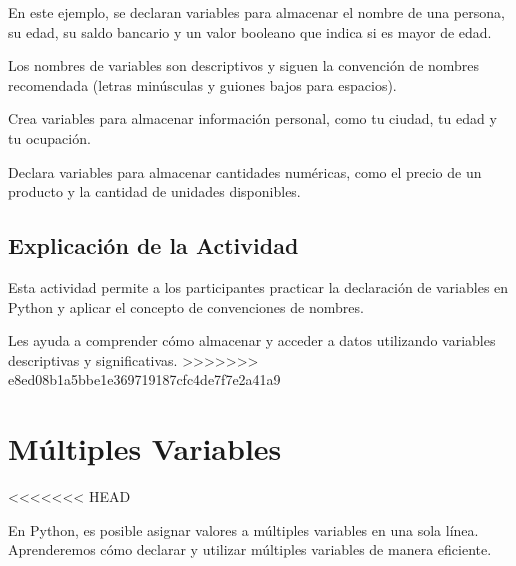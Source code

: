 \documentclass[
  a4paper,
  onepage,
  openany]{scrreprt}
\begin{document}
En este ejemplo, se declaran variables para almacenar el nombre de una
persona, su edad, su saldo bancario y un valor booleano que indica si es
mayor de edad.

Los nombres de variables son descriptivos y siguen la convención de
nombres recomendada (letras minúsculas y guiones bajos para espacios).

\begin{tcolorbox}[enhanced jigsaw, breakable, opacityback=0, toptitle=1mm, coltitle=black, toprule=.15mm, rightrule=.15mm, colframe=quarto-callout-important-color-frame, opacitybacktitle=0.6, arc=.35mm, title=\textcolor{quarto-callout-important-color}{\faExclamation}\hspace{0.5em}{Actividad Práctica}, titlerule=0mm, colbacktitle=quarto-callout-important-color!10!white, bottomtitle=1mm, bottomrule=.15mm, colback=white, left=2mm, leftrule=.75mm]

Crea variables para almacenar información personal, como tu ciudad, tu
edad y tu ocupación.

Declara variables para almacenar cantidades numéricas, como el precio de
un producto y la cantidad de unidades disponibles.

\end{tcolorbox}

\hypertarget{explicaciuxf3n-de-la-actividad-9}{%
\section{Explicación de la
Actividad}\label{explicaciuxf3n-de-la-actividad-9}}

Esta actividad permite a los participantes practicar la declaración de
variables en Python y aplicar el concepto de convenciones de nombres.

Les ayuda a comprender cómo almacenar y acceder a datos utilizando
variables descriptivas y significativas.
\textgreater\textgreater\textgreater\textgreater\textgreater\textgreater\textgreater{}
e8ed08b1a5bbe1e369719187cfc4de7f7e2a41a9

\hypertarget{muxfaltiples-variables}{%
\chapter{Múltiples Variables}\label{muxfaltiples-variables}}

\textless\textless\textless\textless\textless\textless\textless{} HEAD

En Python, es posible asignar valores a múltiples variables en una sola
línea. Aprenderemos cómo declarar y utilizar múltiples variables de
manera eficiente.
\end{document}
